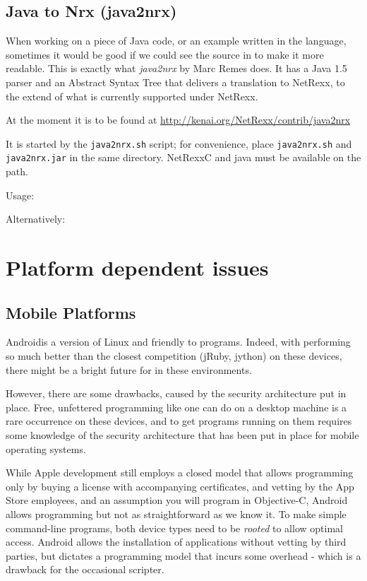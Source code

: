 \section{Java to Nrx (java2nrx)}
When working on a piece of Java code, or an example written in the
language, sometimes it would be good if we could see the source in
\nr{}to make it more readable. This is exactly what \emph{java2nrx}
by Marc Remes does. It has a  Java 1.5 parser and an Abstract Syntax
Tree that delivers a translation to NetRexx, to the
extend of what is currently supported under NetRexx.

At the moment it is to be found at \url{http://kenai.org/NetRexx/contrib/java2nrx}

It is started by the \texttt{java2nrx.sh} script; for convenience, place \texttt{java2nrx.sh} and \texttt{java2nrx.jar} in the
same directory. NetRexxC and java must be available on the path.

Usage:

Alternatively:


\chapter{Platform dependent issues}
\section{Mobile Platforms}
Android\texttrademark is a version of Linux and friendly to \nr{}
programs. Indeed, with \nr{} performing so much better than the closest
competition (jRuby, jython) on these devices, there might be a bright
future for \nr{} in these environments. 

However, there are some drawbacks, caused by the security architecture
put in place. Free, unfettered programming like one can do on a
desktop machine is a rare occurrence on these devices, and to get
programs running on them requires some knowledge of the security
architecture that has been put in place for mobile operating systems.

While Apple development still employs a closed model that allows programming only by
buying a license with accompanying certificates, and vetting by the
App Store employees, and an assumption you will program in
Objective-C, Android allows programming but not as straightforward as
we know it. To make simple command-line \nr{} programs, both device
types need to be \emph{rooted} to allow optimal access. Android allows
the installation of applications without vetting by third parties, but
dictates a programming model that incurs some overhead - which is a
drawback for the occasional scripter.
